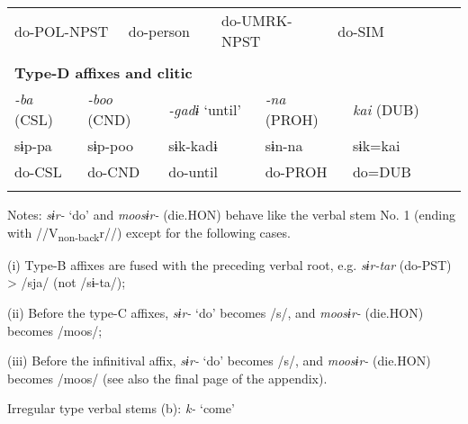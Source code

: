 \begin{tabularx}{\textwidth}{XXXXXXXXXXXXXXXXXXXXX}
\multicolumn{4}{X}{do-POL-NPST} & \multicolumn{4}{X}{do-person} & \multicolumn{4}{X}{do-UMRK-NPST} & \multicolumn{9}{X}{do-SIM}\\
\multicolumn{21}{X}{}\\
\multicolumn{21}{X}{{\bfseries Type-D affixes and clitic}}\\
\multicolumn{2}{X}{{ \textit{{}-ba} (CSL)}} & \multicolumn{4}{X}{{ \textit{{}-boo} (CND)}} & \multicolumn{3}{X}{{ \textit{{}-gadɨ} ‘until’}} & \multicolumn{4}{X}{{ \textit{{}-na} (PROH)}} & \multicolumn{8}{X}{{ \textit{kai} (DUB)}}\\
\multicolumn{2}{X}{{ sɨp-pa}} & \multicolumn{4}{X}{{ sɨp-poo}} & \multicolumn{3}{X}{{ sɨk-kadɨ}} & \multicolumn{4}{X}{{ sɨn-na}} & \multicolumn{8}{X}{{ sɨk=kai}}\\
\multicolumn{2}{X}{do-CSL} & \multicolumn{4}{X}{do-CND} & \multicolumn{3}{X}{do-until} & \multicolumn{4}{X}{do-PROH} & \multicolumn{8}{X}{do=DUB}\\
\lspbottomrule
\end{tabularx}
Notes: \textit{sɨr-} ‘do’ and \textit{moosɨr-} (die.HON) behave like the verbal stem No. 1 (ending with //V\textsubscript{non-back}r//) except for the following cases.

(i)  Type-B affixes are fused with the preceding verbal root, e.g. \textit{sɨr-tar} (do-PST) > /sja/ (not /sɨ-ta/);

(ii)  Before the type-C affixes, \textit{sɨr-} ‘do’ becomes /s/, and \textit{moosɨr-} (die.HON) becomes /moos/;

(iii)  Before the infinitival affix, \textit{sɨr-} ‘do’ becomes /s/, and \textit{moosɨr-} (die.HON) becomes /moos/ (see also the final page of the appendix).

Irregular type verbal stems (b): \textit{k-} ‘come’

\tablefirsthead{}

